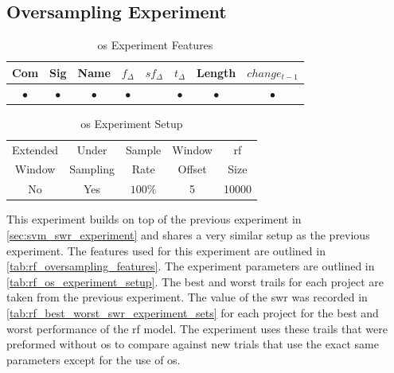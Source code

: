 \subsection{Oversampling Experiment}

\begin{table}[h]
\begin{center}

    \begin{tabular}{|c|c|c|c|c|c|c|c|}
        \hline
        Com & Sig & Name & $f_{\Delta}$ & $sf_{\Delta}$ & $t_\Delta$ & Length & $change_{t-1}$ \\
         \hline
        $\bullet$ & $\bullet$ & $\bullet$ & $\bullet$ & & $\bullet$ & $\bullet$ & $\bullet$ \\ \hline
    \end{tabular}
    \caption{\gls{os} Experiment Features}
    \label{tab:rf_oversampling_features}
\end{center}

\end{table}

\begin{table}[h]
\begin{center}

    \begin{tabular}{|c|c|c|c|c|}
        \hline
        Extended & Under & Sample & Window & \gls{rf} \\
        Window & Sampling & Rate & Offset & Size \\ \hline
        No & Yes & $100\%$ & 5 & 10000 \\ \hline
    \end{tabular}
    \caption{\gls{os} Experiment Setup}
    \label{tab:rf_os_experiment_setup}
\end{center}

\end{table}


This experiment builds on top of the previous experiment in \autoref{sec:svm_swr_experiment} and shares a very similar setup as the previous experiment. The features used for this experiment are outlined in \autoref{tab:rf_oversampling_features}. The experiment parameters are outlined in \autoref{tab:rf_os_experiment_setup}. The best and worst trails for each project are taken from the previous experiment. The value of the \gls{swr} was recorded in \autoref{tab:rf_best_worst_swr_experiment_sets} for each project for the best and worst performance of the \gls{rf} model. The experiment uses these trails that were preformed without \gls{os} to compare against new trials that use the exact same parameters except for the use of \gls{os}.


